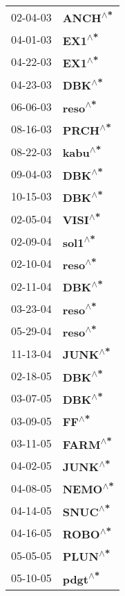 \begin{supertabular}{p{0.08\textwidth}p{0.2\textwidth}}
 02-04-03 &   \textbf{ANCH\textsuperscript{$\wedge$*}} \\
 04-01-03 &    \textbf{EX1\textsuperscript{$\wedge$*}} \\
 04-22-03 &    \textbf{EX1\textsuperscript{$\wedge$*}} \\
 04-23-03 &    \textbf{DBK\textsuperscript{$\wedge$*}} \\
 06-06-03 &   \textbf{reso\textsuperscript{$\wedge$*}} \\
 08-16-03 &   \textbf{PRCH\textsuperscript{$\wedge$*}} \\
 08-22-03 &   \textbf{kabu\textsuperscript{$\wedge$*}} \\
 09-04-03 &    \textbf{DBK\textsuperscript{$\wedge$*}} \\
 10-15-03 &    \textbf{DBK\textsuperscript{$\wedge$*}} \\
 02-05-04 &   \textbf{VISI\textsuperscript{$\wedge$*}} \\
 02-09-04 &   \textbf{sol1\textsuperscript{$\wedge$*}} \\
 02-10-04 &   \textbf{reso\textsuperscript{$\wedge$*}} \\
 02-11-04 &    \textbf{DBK\textsuperscript{$\wedge$*}} \\
 03-23-04 &   \textbf{reso\textsuperscript{$\wedge$*}} \\
 05-29-04 &   \textbf{reso\textsuperscript{$\wedge$*}} \\
 11-13-04 &   \textbf{JUNK\textsuperscript{$\wedge$*}} \\
 02-18-05 &    \textbf{DBK\textsuperscript{$\wedge$*}} \\
 03-07-05 &    \textbf{DBK\textsuperscript{$\wedge$*}} \\
 03-09-05 &     \textbf{FF\textsuperscript{$\wedge$*}} \\
 03-11-05 &   \textbf{FARM\textsuperscript{$\wedge$*}} \\
 04-02-05 &   \textbf{JUNK\textsuperscript{$\wedge$*}} \\
 04-08-05 &   \textbf{NEMO\textsuperscript{$\wedge$*}} \\
 04-14-05 &   \textbf{SNUC\textsuperscript{$\wedge$*}} \\
 04-16-05 &   \textbf{ROBO\textsuperscript{$\wedge$*}} \\
 05-05-05 &   \textbf{PLUN\textsuperscript{$\wedge$*}} \\
 05-10-05 &   \textbf{pdgt\textsuperscript{$\wedge$*}} \\

\end{supertabular}
